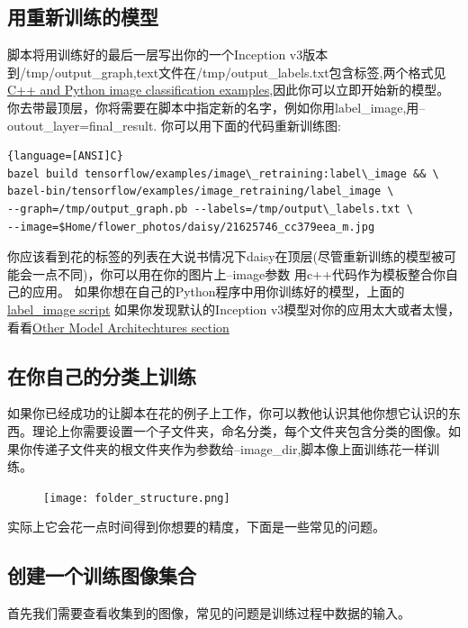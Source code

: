 \subsection{用重新训练的模型}
脚本将用训练好的最后一层写出你的一个Inception v3版本到/tmp/output\_graph,text文件在/tmp/output\_labels.txt包含标签,两个格式见
\href{https://www.tensorflow.org/tutorials/image_recognition}{C++ and Python image classification examples},因此你可以立即开始新的模型。你去带最顶层，你将需要在脚本中指定新的名字，例如你用label\_image,用--outout\_layer=final\_result.
你可以用下面的代码重新训练图:
\begin{lstlisting}{language=[ANSI]C}
bazel build tensorflow/examples/image\_retraining:label\_image && \
bazel-bin/tensorflow/examples/image_retraining/label_image \
--graph=/tmp/output_graph.pb --labels=/tmp/output\_labels.txt \
--image=$Home/flower_photos/daisy/21625746_cc379eea_m.jpg
\end{lstlisting}
你应该看到花的标签的列表在大说书情况下daisy在顶层(尽管重新训练的模型被可能会一点不同)，你可以用在你的图片上--image参数
用c++代码作为模板整合你自己的应用。
如果你想在自己的Python程序中用你训练好的模型，上面的\href{https://www.github.com/tensorflow/tensorflow/blob/r1.3/tensorflow/examples/image_retraining/label_image.py}{label\_image script}
如果你发现默认的Inception v3模型对你的应用太大或者太慢，看看\href{https://www.tensorflow.org/tutorials/image_retraining#other_model_architectures}{Other Model Architechtures section}
\subsection{在你自己的分类上训练}
如果你已经成功的让脚本在花的例子上工作，你可以教他认识其他你想它认识的东西。理论上你需要设置一个子文件夹，命名分类，每个文件夹包含分类的图像。如果你传递子文件夹的根文件夹作为参数给--image\_dir,脚本像上面训练花一样训练。
\begin{center}
\begin{figure}
\texttt{[image: folder\_structure.png]}
\end{figure}
\end{center}
实际上它会花一点时间得到你想要的精度，下面是一些常见的问题。
\subsection{创建一个训练图像集合}
首先我们需要查看收集到的图像，常见的问题是训练过程中数据的输入。

